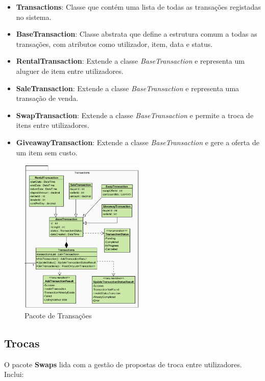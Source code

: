 \documentclass[a4paper, 12pt]{article} %
\begin{document}
\begin{itemize}
	\item \textbf{Transactions}: Classe que contém uma lista de todas as transações registadas no sistema.
	\item \textbf{BaseTransaction}: Classe abstrata que define a estrutura comum a todas as transações, com atributos como utilizador, item, data e status.
	\item \textbf{RentalTransaction}: Extende a classe \textit{BaseTransaction} e representa um aluguer de item entre utilizadores.
	\item \textbf{SaleTransaction}: Extende a classe \textit{BaseTransaction} e representa uma transação de venda.
	\item \textbf{SwapTransaction}: Extende a classe \textit{BaseTransaction} e permite a troca de itens entre utilizadores.
	\item \textbf{GiveawayTransaction}: Extende a classe \textit{BaseTransaction} e gere a oferta de um item sem custo.
\end{itemize}

\begin{figure}[ht]
	\centering
	\includegraphics[width=0.53\textwidth]{diagrama_classes_transacoes.png}
	\caption{Pacote de Transações}
	\label{fig:diagrama_classes_transacoes}
\end{figure}

\subsection{Trocas}

O pacote \textbf{Swaps} lida com a gestão de propostas de troca entre utilizadores. Inclui:
\end{document}

